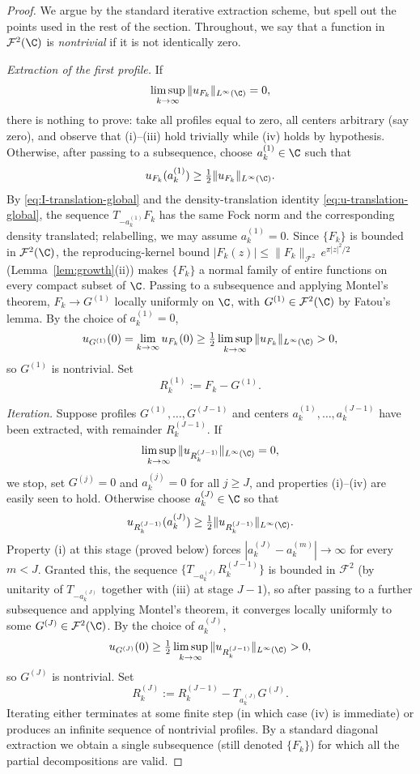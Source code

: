 \begin{proof}
We argue by the standard iterative extraction scheme, but spell out the points
used in the rest of the section. Throughout, we say that a function in
\(\mathcal F^2(\C)\) is \emph{nontrivial} if it is not identically zero.

\medskip
\noindent\emph{Extraction of the first profile.}
If
\[
\limsup_{k\to\infty}\|u_{F_k}\|_{L^\infty(\C)}=0,
\]
there is nothing to prove: take all profiles equal to zero, all centers
arbitrary (say zero), and observe that (i)--(iii) hold trivially while (iv)
holds by hypothesis. Otherwise, after passing to a subsequence, choose
\(a_k^{(1)}\in \C\) such that
\[
u_{F_k}(a_k^{(1)})\ge \tfrac12\|u_{F_k}\|_{L^\infty(\C)}.
\]
By \eqref{eq:I-translation-global} and the density-translation identity
\eqref{eq:u-translation-global}, the sequence \(T_{-a_k^{(1)}}F_k\) has the
same Fock norm and the corresponding density translated; relabelling, we may
assume \(a_k^{(1)}=0\). Since \(\{F_k\}\) is bounded in \(\mathcal F^2(\C)\),
the reproducing-kernel bound \(|F_k(z)|\le \|F_k\|_{\mathcal F^2}\,
e^{\pi |z|^2/2}\) (Lemma~\ref{lem:growth}(ii)) makes \(\{F_k\}\) a normal
family of entire functions on every compact subset of \(\C\). Passing to a
subsequence and applying Montel's theorem, \(F_k\to G^{(1)}\) locally
uniformly on \(\C\), with \(G^{(1)}\in\mathcal F^2(\C)\) by Fatou's lemma. By
the choice of \(a_k^{(1)}=0\),
\[
u_{G^{(1)}}(0)=\lim_{k\to\infty}u_{F_k}(0)
\ge \tfrac12 \limsup_{k\to\infty}\|u_{F_k}\|_{L^\infty(\C)}>0,
\]
so \(G^{(1)}\) is nontrivial. Set
\[
R_k^{(1)}:=F_k-G^{(1)}.
\]

\medskip
\noindent\emph{Iteration.}
Suppose profiles \(G^{(1)},\dots,G^{(J-1)}\) and centers
\(a_k^{(1)},\dots,a_k^{(J-1)}\) have been extracted, with remainder
\(R_k^{(J-1)}\). If
\[
\limsup_{k\to\infty}\|u_{R_k^{(J-1)}}\|_{L^\infty(\C)}=0,
\]
we stop, set \(G^{(j)}=0\) and \(a_k^{(j)}=0\) for all \(j\ge J\), and
properties (i)--(iv) are easily seen to hold. Otherwise choose
\(a_k^{(J)}\in\C\) so that
\[
u_{R_k^{(J-1)}}(a_k^{(J)})
\ge \tfrac12\|u_{R_k^{(J-1)}}\|_{L^\infty(\C)}.
\]
Property (i) at this stage (proved below) forces
\(|a_k^{(J)}-a_k^{(m)}|\to\infty\) for every \(m<J\). Granted this, the
sequence \(\{T_{-a_k^{(J)}}R_k^{(J-1)}\}\) is bounded in \(\mathcal F^2\) (by
unitarity of \(T_{-a_k^{(J)}}\) together with (iii) at stage \(J-1\)), so
after passing to a further subsequence and applying Montel's theorem, it
converges locally uniformly to some \(G^{(J)}\in\mathcal F^2(\C)\). By the
choice of \(a_k^{(J)}\),
\[
u_{G^{(J)}}(0)
\ge \tfrac12 \limsup_{k\to\infty}\|u_{R_k^{(J-1)}}\|_{L^\infty(\C)}>0,
\]
so \(G^{(J)}\) is nontrivial. Set
\[
R_k^{(J)}:=R_k^{(J-1)}-T_{a_k^{(J)}}G^{(J)}.
\]
Iterating either terminates at some finite step (in which case (iv) is
immediate) or produces an infinite sequence of nontrivial profiles. By a
standard diagonal extraction we obtain a single subsequence (still denoted
\(\{F_k\}\)) for which all the partial decompositions are valid.


\end{proof}
